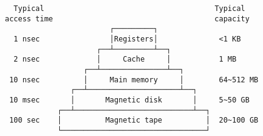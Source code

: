 \documentclass[varwidth=40em,crop]{standalone}
\begin{document}
\begin{verbatim}
  Typical                                       Typical 
access time                                     capacity
                        ┌─────────┐
  1 nsec                │Registers│              <1 KB
                     ┌──┴─────────┴──┐
  2 nsec             │     Cache     │           1 MB
                  ┌──┴───────────────┴──┐
 10 nsec          │     Main memory     │        64~512 MB
               ┌──┴─────────────────────┴──┐
 10 msec       │       Magnetic disk       │     5~50 GB
            ┌──┴───────────────────────────┴──┐
 100 sec    │          Magnetic tape          │  20~100 GB
            └─────────────────────────────────┘
\end{verbatim}
\end{document}
